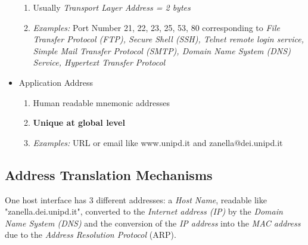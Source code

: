 \begin{itemize}
\begin{enumerate}
    \item Usually \textit{Transport Layer Address = 2 bytes}
    \item \emph{Examples: } Port Number 21, 22, 23, 25, 53, 80 corresponding to \textit{File Transfer Protocol (FTP), Secure Shell (SSH), Telnet remote login service, Simple Mail Transfer Protocol (SMTP), Domain Name System (DNS) Service, Hypertext Transfer Protocol}
	\end{enumerate}
\item Application Address
	\begin{enumerate}
	\item Human readable mnemonic addresses
    \item \textbf{Unique at global level}
    \item \emph{Examples: } URL or email like www.unipd.it and zanella@dei.unipd.it
	\end{enumerate}
\end{itemize}

\subsection{Address Translation Mechanisms}
One host interface has 3 different addresses: a \emph{Host Name}, readable like "zanella.dei.unipd.it", converted to the \emph{Internet address (IP)} by the \emph{Domain Name System (DNS)} and the conversion of the \textit{IP address} into the \textit{MAC address} due to the \textit{Address Resolution Protocol} (ARP).

